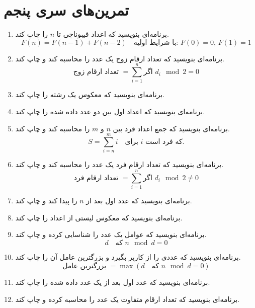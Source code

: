 \documentclass[a4paper,12pt]{article}
\begin{document}
	\section*{تمرین‌های سری پنجم}
	\begin{enumerate}
		
		
		\item برنامه‌ای بنویسید که اعداد فیبوناچی تا \(n\) را چاپ کند. 
		\[
		F(n) = F(n-1) + F(n-2) \quad \text{با شرایط اولیه: } F(0) = 0, \, F(1) = 1
		\]
		
		\item برنامه‌ای بنویسید که تعداد ارقام زوج یک عدد را محاسبه کند و چاپ کند.
		\[
		\text{تعداد ارقام زوج } = \sum_{i=1}^{n} \text{اگر } d_i \mod 2 = 0
		\]
		
		\item برنامه‌ای بنویسید که معکوس یک رشته را چاپ کند.
		
		\item برنامه‌ای بنویسید که اعداد اول بین دو عدد داده شده را چاپ کند.
		
		\item برنامه‌ای بنویسید که جمع اعداد فرد بین \(n\) و \(m\) را محاسبه کند و چاپ کند.
		\[
		S = \sum_{i=n}^{m} i \quad \text{برای } i \text{ که فرد است.}
		\]
		
		\item برنامه‌ای بنویسید که تعداد ارقام فرد یک عدد را محاسبه کند و چاپ کند.
		\[
		\text{تعداد ارقام فرد } = \sum_{i=1}^{n} \text{اگر } d_i \mod 2 \neq 0
		\]
		
		\item برنامه‌ای بنویسید که عدد اول بعد از \(n\) را پیدا کند و چاپ کند.
		
		\item برنامه‌ای بنویسید که معکوس لیستی از اعداد را چاپ کند.
		
		\item برنامه‌ای بنویسید که عوامل یک عدد را شناسایی کرده و چاپ کند.
		\[
		d \quad \text{که } n \mod d = 0
		\]
		
		\item برنامه‌ای بنویسید که عددی را از کاربر بگیرد و بزرگترین عامل آن را چاپ کند.
		\[
		\text{بزرگترین عامل } = \max(d \quad \text{که } n \mod d = 0)
		\]
		
		\item برنامه‌ای بنویسید که عدد اول بعد از یک عدد داده شده را چاپ کند.
		
		\item برنامه‌ای بنویسید که تعداد ارقام متفاوت یک عدد را محاسبه کرده و چاپ کند.
		

\end{enumerate}
\end{document}
